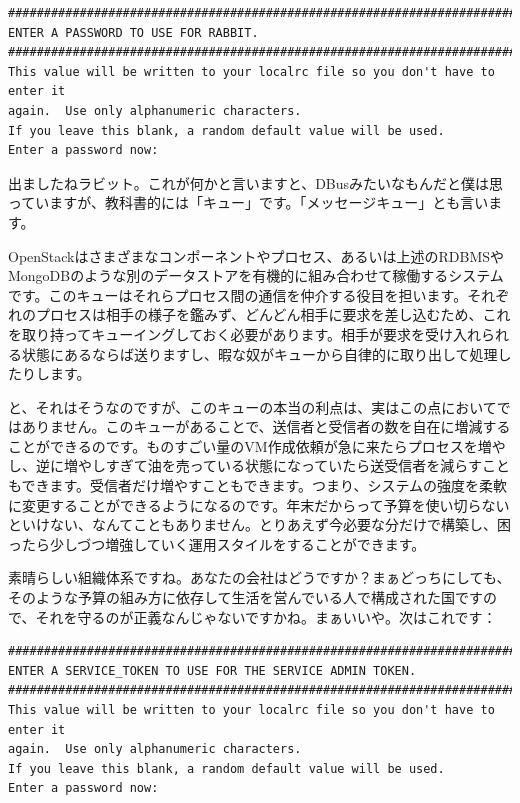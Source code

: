 \documentclass[8pt,b5paper,tombo,openany]{jsbook}
\begin{document}
\begin{lstlisting}
################################################################################
ENTER A PASSWORD TO USE FOR RABBIT.
################################################################################
This value will be written to your localrc file so you don't have to enter it
again.  Use only alphanumeric characters.
If you leave this blank, a random default value will be used.
Enter a password now:
\end{lstlisting}

出ましたねラビット。これが何かと言いますと、DBusみたいなもんだと僕は思っていますが、教科書的には「キュー」です。「メッセージキュー」とも言います。

OpenStackはさまざまなコンポーネントやプロセス、あるいは上述のRDBMSやMongoDBのような別のデータストアを有機的に組み合わせて稼働するシステムです。このキューはそれらプロセス間の通信を仲介する役目を担います。それぞれのプロセスは相手の様子を鑑みず、どんどん相手に要求を差し込むため、これを取り持ってキューイングしておく必要があります。相手が要求を受け入れられる状態にあるならば送りますし、暇な奴がキューから自律的に取り出して処理したりします。

と、それはそうなのですが、このキューの本当の利点は、実はこの点においてではありません。このキューがあることで、送信者と受信者の数を自在に増減することができるのです。ものすごい量のVM作成依頼が急に来たらプロセスを増やし、逆に増やしすぎて油を売っている状態になっていたら送受信者を減らすこともできます。受信者だけ増やすこともできます。つまり、システムの強度を柔軟に変更することができるようになるのです。年末だからって予算を使い切らないといけない、なんてこともありません。とりあえず今必要な分だけで構築し、困ったら少しづつ増強していく運用スタイルをすることができます。

素晴らしい組織体系ですね。あなたの会社はどうですか？まぁどっちにしても、そのような予算の組み方に依存して生活を営んでいる人で構成された国ですので、それを守るのが正義なんじゃないですかね。まぁいいや。次はこれです：

\begin{lstlisting}
################################################################################
ENTER A SERVICE_TOKEN TO USE FOR THE SERVICE ADMIN TOKEN.
################################################################################
This value will be written to your localrc file so you don't have to enter it
again.  Use only alphanumeric characters.
If you leave this blank, a random default value will be used.
Enter a password now:
\end{lstlisting}
\end{document}
